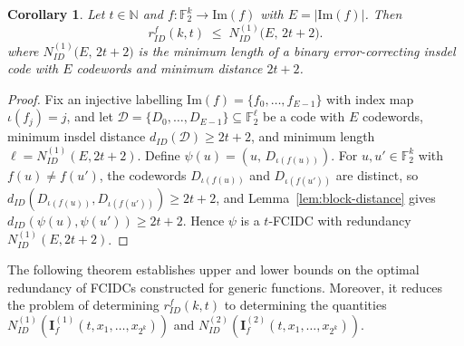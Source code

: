 \documentclass[11 pt]{article}
\numberwithin{equation}{section}
\newtheorem{corollary}[theorem]{Corollary}
\begin{document}
    \begin{corollary}
    \label{cor:append-construction}
    Let $t \in \mathbb{N}$ and $f:\mathbb{F}_2^{k}\to \mathrm{Im}(f)$ with $E=|\mathrm{Im}(f)|$. Then
    \[
        r^{f}_{ID}(k,t) \;\le\; N^{(1)}_{ID}\big(E,\, 2t+2\big).
    \]
    where $N^{(1)}_{ID}\big(E,\, 2t+2\big)$ is the minimum length of a binary error-correcting insdel code with $E$ codewords and minimum distance $2t+2$.
    \end{corollary}

    \begin{proof}
    Fix an injective labelling $\mathrm{Im}(f)=\{f_0,\dots,f_{E-1}\}$ with index map $\iota(f_j)=j$, and let $\mathcal{D}=\{D_0,\dots,D_{E-1}\}\subseteq\mathbb{F}_2^{\ell}$ be a code with $E$ codewords, minimum insdel distance $d_{ID}(\mathcal{D})\ge 2t+2$, and minimum length $\ell=N^{(1)}_{ID}(E,2t+2)$. Define $\psi(u)=(u,\,D_{\iota(f(u))})$. For $u,u'\in\mathbb{F}_2^{k}$ with $f(u)\ne f(u')$, the codewords $D_{\iota(f(u))}$ and $D_{\iota(f(u'))}$ are distinct, so $d_{ID}(D_{\iota(f(u))},D_{\iota(f(u'))})\ge 2t+2$, and Lemma~\ref{lem:block-distance} gives $d_{ID}(\psi(u),\psi(u'))\ge 2t+2$. Hence $\psi$ is a $t$-FCIDC with redundancy $N^{(1)}_{ID}(E,2t+2)$.
    \end{proof}


    The following theorem establishes upper and lower bounds on the optimal redundancy of FCIDCs constructed for generic functions. Moreover, it reduces the problem of determining \( r^{f}_{ID}(k,t) \) to determining the quantities \( N_{ID}^{(1)}\left( \boldsymbol{I}^{(1)}_{f}(t, x_{1}, \ldots, x_{2^k})\right) \) and \( N_{ID}^{(2)}\!\left(\boldsymbol{I}^{(2)}_{f}(t, x_{1}, \ldots, x_{2^k})\right) \).
\end{document}
